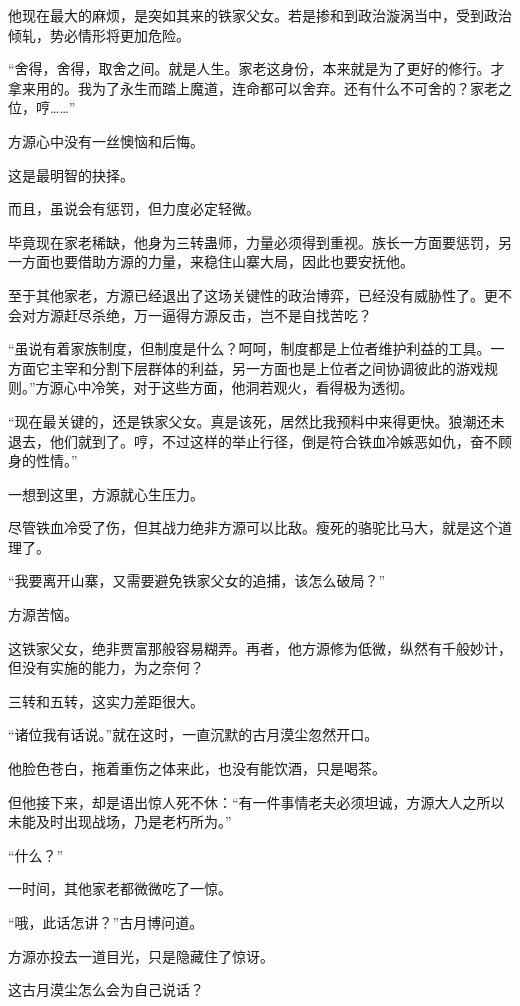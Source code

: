 \begin{this_body}
他现在最大的麻烦，是突如其来的铁家父女。若是掺和到政治漩涡当中，受到政治倾轧，势必情形将更加危险。

“舍得，舍得，取舍之间。就是人生。家老这身份，本来就是为了更好的修行。才拿来用的。我为了永生而踏上魔道，连命都可以舍弃。还有什么不可舍的？家老之位，哼……”

方源心中没有一丝懊恼和后悔。

这是最明智的抉择。

而且，虽说会有惩罚，但力度必定轻微。

毕竟现在家老稀缺，他身为三转蛊师，力量必须得到重视。族长一方面要惩罚，另一方面也要借助方源的力量，来稳住山寨大局，因此也要安抚他。

至于其他家老，方源已经退出了这场关键性的政治博弈，已经没有威胁性了。更不会对方源赶尽杀绝，万一逼得方源反击，岂不是自找苦吃？

“虽说有着家族制度，但制度是什么？呵呵，制度都是上位者维护利益的工具。一方面它主宰和分割下层群体的利益，另一方面也是上位者之间协调彼此的游戏规则。”方源心中冷笑，对于这些方面，他洞若观火，看得极为透彻。

“现在最关键的，还是铁家父女。真是该死，居然比我预料中来得更快。狼潮还未退去，他们就到了。哼，不过这样的举止行径，倒是符合铁血冷嫉恶如仇，奋不顾身的性情。”

一想到这里，方源就心生压力。

尽管铁血冷受了伤，但其战力绝非方源可以比敌。瘦死的骆驼比马大，就是这个道理了。

“我要离开山寨，又需要避免铁家父女的追捕，该怎么破局？”

方源苦恼。

这铁家父女，绝非贾富那般容易糊弄。再者，他方源修为低微，纵然有千般妙计，但没有实施的能力，为之奈何？

三转和五转，这实力差距很大。

“诸位我有话说。”就在这时，一直沉默的古月漠尘忽然开口。

他脸色苍白，拖着重伤之体来此，也没有能饮酒，只是喝茶。

但他接下来，却是语出惊人死不休：“有一件事情老夫必须坦诚，方源大人之所以未能及时出现战场，乃是老朽所为。”

“什么？”

一时间，其他家老都微微吃了一惊。

“哦，此话怎讲？”古月博问道。

方源亦投去一道目光，只是隐藏住了惊讶。

这古月漠尘怎么会为自己说话？


\end{this_body}
